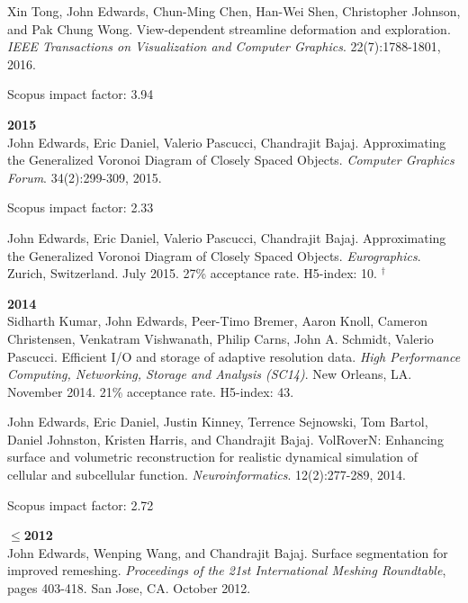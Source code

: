 \documentclass[margin,line]{res}
\newcommand{\pubunder}[1]{#1}
\begin{document}
\begin{resume}
Xin Tong, \pubunder{John Edwards}, Chun-Ming Chen, Han-Wei Shen, Christopher Johnson, and Pak Chung Wong. View-dependent streamline deformation and exploration. \textit{IEEE Transactions on Visualization and Computer Graphics}. 22(7):1788-1801, 2016.
\begin{IMPACT}
Scopus impact factor: 3.94 %
\end{IMPACT}

\textbf{2015} \\
\pubunder{John Edwards}, Eric Daniel, Valerio Pascucci, Chandrajit Bajaj. Approximating the Generalized Voronoi Diagram of Closely Spaced Objects. \textit{Computer Graphics Forum}. 34(2):299-309, 2015.
\begin{IMPACT}
Scopus impact factor: 2.33 %
\end{IMPACT}

\pubunder{John Edwards}, Eric Daniel, Valerio Pascucci, Chandrajit Bajaj. Approximating the Generalized Voronoi Diagram of Closely Spaced Objects. \textit{Eurographics}. Zurich, Switzerland. July 2015. 27\% acceptance rate. H5-index: 10.
$^\dagger$

\textbf{2014} \\
Sidharth Kumar, \pubunder{John Edwards}, Peer-Timo Bremer, Aaron Knoll, Cameron Christensen, Venkatram Vishwanath, Philip Carns, John A. Schmidt, Valerio Pascucci. Efficient I/O and storage of adaptive resolution data. \textit{High Performance Computing, Networking, Storage and Analysis (SC14)}. New Orleans, LA. November 2014. 21\% acceptance rate. H5-index: 43.

\pubunder{John Edwards}, Eric Daniel, Justin Kinney, Terrence Sejnowski, Tom Bartol, Daniel Johnston, Kristen Harris, and Chandrajit Bajaj. VolRoverN: Enhancing surface and volumetric reconstruction for realistic dynamical simulation of cellular and subcellular function.  \textit{Neuroinformatics}. 12(2):277-289, 2014.
\begin{IMPACT}
Scopus impact factor: 2.72 %
\end{IMPACT}

\textbf{$\le$2012} \\
\pubunder{John Edwards}, Wenping Wang, and Chandrajit Bajaj. Surface segmentation for improved remeshing. \textit{Proceedings of the 21st International Meshing Roundtable}, pages 403-418. San Jose, CA. October 2012.


\end{resume}
\end{document}
